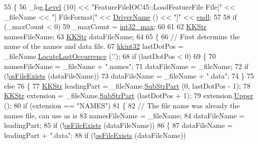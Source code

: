 \begin{DoxyCode}
55 \{
56   \_log.\hyperlink{class_k_k_b_1_1_run_log_a32cf761d7f2e747465fd80533fdbb659}{Level} (10) << \textcolor{stringliteral}{"FeatureFileIOC45::LoadFeatureFile  File["} << \_fileName << \textcolor{stringliteral}{"]  FileFormat["} << 
      \hyperlink{class_k_k_m_l_l_1_1_feature_file_i_o_a98951a8ef9ae5fe5fca831afb57dc1c7}{DriverName} () << \textcolor{stringliteral}{"]"} << \hyperlink{namespace_k_k_b_ad1f50f65af6adc8fa9e6f62d007818a8}{endl};
57   
58   \textcolor{keywordflow}{if}  (\_maxCount < 0)
59     \_maxCount = \hyperlink{_k_k_base_types_8h_ab1240c5d3fea865121ed4684f8e968f6}{int32\_max};
60 
61 
62   \hyperlink{class_k_k_b_1_1_k_k_str}{KKStr}  namesFileName;
63   \hyperlink{class_k_k_b_1_1_k_k_str}{KKStr}  dataFileName;
64 
65   \{
66     \textcolor{comment}{// First determine the name of the names and data file.}
67     \hyperlink{namespace_k_k_b_a8fa4952cc84fda1de4bec1fbdd8d5b1b}{kkint32} lastDotPos = \_fileName.\hyperlink{class_k_k_b_1_1_k_k_str_a595b364acd17c015b5f66d9f7996bfab}{LocateLastOccurrence} (\textcolor{charliteral}{'.'});
68     \textcolor{keywordflow}{if}  (lastDotPos < 0)
69     \{
70       namesFileName = \_fileName + \textcolor{stringliteral}{".names"};
71       dataFileName  = \_fileName;
72       \textcolor{keywordflow}{if}  (!\hyperlink{namespace_k_k_b_aba5c7fcb492dea01f2115c492ff65d83}{osFileExists} (dataFileName))
73         dataFileName  = \_fileName + \textcolor{stringliteral}{".data"};
74     \}
75     \textcolor{keywordflow}{else}
76     \{
77       \hyperlink{class_k_k_b_1_1_k_k_str}{KKStr} leadingPart = \_fileName.\hyperlink{class_k_k_b_1_1_k_k_str_a5f20b2ddfc9f07c8ef99592810332ddb}{SubStrPart} (0, lastDotPos - 1);
78       \hyperlink{class_k_k_b_1_1_k_k_str}{KKStr} extension   = \_fileName.\hyperlink{class_k_k_b_1_1_k_k_str_a5f20b2ddfc9f07c8ef99592810332ddb}{SubStrPart} (lastDotPos + 1);
79       extension.\hyperlink{class_k_k_b_1_1_k_k_str_a66ea0feabc94da88591b56a683695bd9}{Upper} ();
80       \textcolor{keywordflow}{if}  (extension == \textcolor{stringliteral}{"NAMES"})
81       \{
82         \textcolor{comment}{// The file name was already the names file, can use as is}
83         namesFileName = \_fileName;
84         dataFileName  = leadingPart;
85         \textcolor{keywordflow}{if}  (!\hyperlink{namespace_k_k_b_aba5c7fcb492dea01f2115c492ff65d83}{osFileExists} (dataFileName))
86         \{
87           dataFileName  = leadingPart + \textcolor{stringliteral}{".data"};
88           \textcolor{keywordflow}{if}  (!\hyperlink{namespace_k_k_b_aba5c7fcb492dea01f2115c492ff65d83}{osFileExists} (dataFileName))

\end{DoxyCode}
